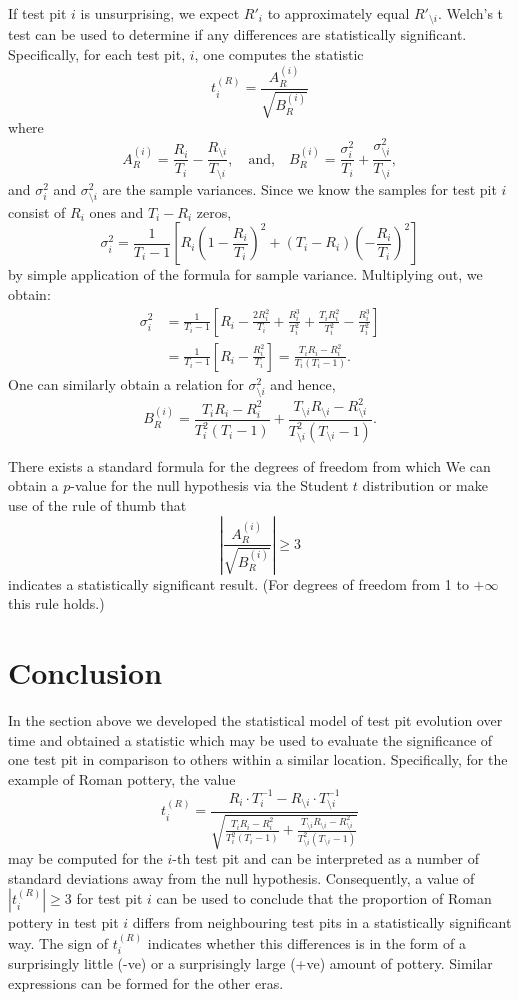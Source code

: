 \documentclass[conference]{IEEEtran}
\begin{document}
If test pit $i$ is unsurprising, we expect $R'_i$ to approximately equal
$R'_{\setminus i}$. Welch's t test can be used to determine if any differences
are statistically significant. Specifically, for each test pit, $i$, one
computes the statistic
\[
    t^{(R)}_i = \frac{A^{(i)}_R}{\sqrt{B^{(i)}_R}}
\]
where
\[
    A^{(i)}_R = \frac{R_i}{T_i} - \frac{R_{\setminus i}}{T_{\setminus i}},
    \quad\mbox{and,}\quad
    B^{(i)}_R = \frac{\sigma^2_i}{T_i} +
    \frac{\sigma^2_{\setminus i}}{T_{\setminus i}},
\]
and $\sigma^2_i$ and $\sigma^2_{\setminus i}$ are the sample variances. Since we
know the samples for test pit $i$ consist of $R_i$ ones and $T_i-R_i$ zeros,
\[
    \sigma^2_i = \frac{1}{T_i-1} \left[
        R_i\left(1-\frac{R_i}{T_i}\right)^2 +
    (T_i-R_i)\left(-\frac{R_i}{T_i}\right)^2 \right]
\]
by simple application of the formula for sample variance. Multiplying out, we
obtain:
\begin{align*}
    \sigma^2_i &= \frac{1}{T_i-1} \left[
        R_i - \frac{2R_i^2}{T_i} + \frac{R_i^3}{T_i^2} +
        \frac{T_iR_i^2}{T_i^2} - \frac{R_i^3}{T_i^2}
    \right] \\
    &= \frac{1}{T_i-1} \left[
        R_i - \frac{R_i^2}{T_i} 
    \right] =
    \frac{T_i R_i - R_i^2}{T_i(T_i-1)}.
\end{align*}
One can similarly obtain a relation for $\sigma^2_{\setminus i}$ and hence,
\[
    B^{(i)}_R =
    \frac{T_i R_i - R_i^2}{T^2_i(T_i-1)} +
    \frac{T_{\setminus i} R_{\setminus i} - R_{\setminus i}^2}{T^2_{\setminus
    i}(T_{\setminus i}-1)}.
\]

There exists a standard formula for the degrees of freedom from which We can
obtain a $p$-value for the null hypothesis via the Student $t$ distribution or
make use of the rule of thumb that
\[
    \left|\frac{A^{(i)}_R}{\sqrt{B^{(i)}_R}}\right| \ge 3
\]
indicates a statistically significant result. (For degrees of freedom from 1 to
$+\infty$ this rule holds.)

\section{Conclusion}

In the section above we developed the statistical model of test pit evolution
over time and obtained a statistic which may be used to evaluate the
significance of one test pit in comparison to others within a similar location.
Specifically, for the example of Roman pottery, the value
\[
    t^{(R)}_i = \frac{R_i \cdot T^{-1}_i - R_{\setminus i} \cdot T^{-1}_{\setminus
    i}}{\sqrt{
    \frac{T_i R_i - R_i^2}{T^2_i(T_i-1)} +
    \frac{T_{\setminus i} R_{\setminus i} - R_{\setminus i}^2}{T^2_{\setminus
    i}(T_{\setminus i}-1)}}}
\]
may be computed for the $i$-th test pit and can be interpreted as a number of
standard deviations away from the null hypothesis. Consequently, a value of
$|t^{(R)}_i| \ge 3$ for test pit $i$ can be used to conclude that the proportion
of Roman pottery in test pit $i$ differs from neighbouring test pits in a
statistically significant way. The sign of $t^{(R)}_i$ indicates whether this
differences is in the form of a surprisingly little (-ve) or a surprisingly
large (+ve) amount of pottery. Similar expressions can be formed for the other
eras.
\end{document}
